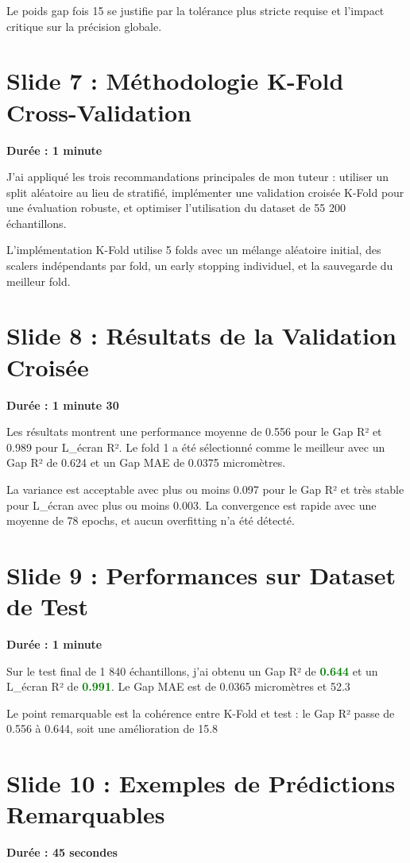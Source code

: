 \documentclass[12pt,a4paper]{article}
\begin{document}
Le poids gap fois 15 se justifie par la tolérance plus stricte requise et l'impact critique sur la précision globale.

\section{Slide 7 : Méthodologie K-Fold Cross-Validation}
\textbf{Durée : 1 minute}

J'ai appliqué les trois recommandations principales de mon tuteur : utiliser un split aléatoire au lieu de stratifié, implémenter une validation croisée K-Fold pour une évaluation robuste, et optimiser l'utilisation du dataset de 55 200 échantillons.

L'implémentation K-Fold utilise 5 folds avec un mélange aléatoire initial, des scalers indépendants par fold, un early stopping individuel, et la sauvegarde du meilleur fold.

\section{Slide 8 : Résultats de la Validation Croisée}
\textbf{Durée : 1 minute 30}

Les résultats montrent une performance moyenne de 0.556 pour le Gap R² et 0.989 pour L\_écran R². Le fold 1 a été sélectionné comme le meilleur avec un Gap R² de 0.624 et un Gap MAE de 0.0375 micromètres. 

La variance est acceptable avec plus ou moins 0.097 pour le Gap R² et très stable pour L\_écran avec plus ou moins 0.003. La convergence est rapide avec une moyenne de 78 epochs, et aucun overfitting n'a été détecté.

\section{Slide 9 : Performances sur Dataset de Test}
\textbf{Durée : 1 minute}

Sur le test final de 1 840 échantillons, j'ai obtenu un Gap R² de \textcolor{green}{\textbf{0.644}} et un L\_écran R² de \textcolor{green}{\textbf{0.991}}. Le Gap MAE est de 0.0365 micromètres et 52.3%

Le point remarquable est la cohérence entre K-Fold et test : le Gap R² passe de 0.556 à 0.644, soit une amélioration de 15.8%

\section{Slide 10 : Exemples de Prédictions Remarquables}
\textbf{Durée : 45 secondes}
\end{document}
